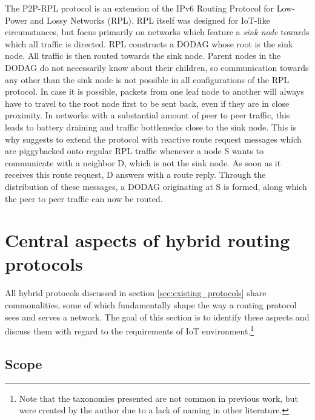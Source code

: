 \documentclass[a4paper,10pt]{scrartcl}
\begin{document}
The P2P-RPL protocol is an extension of the IPv6 Routing Protocol for Low-Power and Lossy Networks (RPL)\cite{RFC-6550}. RPL itself was designed for IoT-like circumstances, but focus primarily on networks which feature a \emph{sink node} towards which all traffic is directed. RPL constructs a \gls{DODAG} whose root is the sink node. All traffic is then routed towards the sink node. Parent nodes in the DODAG do not necessarily know about their children, so communication towards any other than the sink node is not possible in all configurations of the RPL protocol. In case it is possible, packets from one leaf node to another will always have to travel to the root node first to be sent back, even if they are in close proximity. In networks with a substantial amount of peer to peer traffic, this leads to battery draining and traffic bottlenecks close to the sink node. This is why \cite{baccelli_p2p_rpl} suggests to extend the protocol with reactive route request messages which are piggybacked onto regular RPL traffic whenever a node S wants to communicate with a neighbor D, which is not the sink node. As soon as it receives this route request, D answers with a route reply. Through the distribution of these messages, a DODAG originating at S is formed, along which the peer to peer traffic can now be routed.

\newpage

\section{Central aspects of hybrid routing protocols}
\label{sec:key_aspects}
All hybrid protocols discussed in section \ref{sec:existing_protocols} share commonalities, some of which fundamentally shape the way a routing protocol sees and serves a network. The goal of this section is to identify these aspects and discuss them with regard to the requirements of IoT environment.\footnote{Note that the taxonomies presented are not common in previous work, but were created by the author due to a lack of naming in other literature.}

\subsection{Scope}
\label{subsec:scope}
\end{document}
